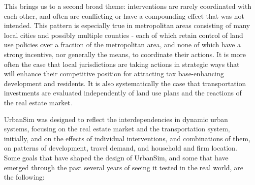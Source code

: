 This brings us to a second broad theme: interventions are rarely coordinated with each other, and often are conflicting or have a compounding effect that was not intended.  This pattern is especially true in metropolitan areas consisting of many local cities and possibly multiple counties - each of which retain control of land use policies over a fraction of the metropolitan area, and none of which have a strong incentive, nor generally the means, to coordinate their actions.  It is more often the case that local jurisdictions are taking actions in strategic ways that will enhance their competitive position for attracting tax base-enhancing development and residents.  It is also systematically the case that transportation investments are evaluated independently of land use plans and the reactions of the real estate market.

UrbanSim was designed to reflect the interdependencies in dynamic urban systems, focusing on the real estate market and the transportation system, initially, and on the effects of individual interventions, and combinations of them, on patterns of development, travel demand, and household and firm location.  Some goals that have shaped the design of UrbanSim, and some that have emerged through the past several years of seeing it tested in the real world, are the following:

